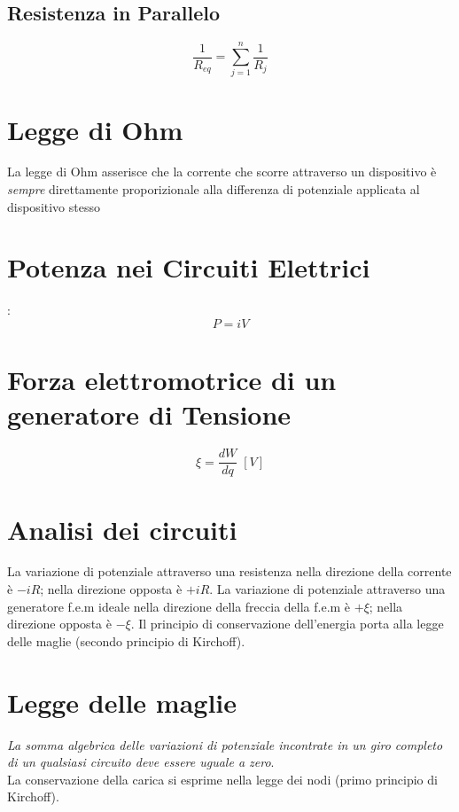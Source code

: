        \subsection*{Resistenza in Parallelo}
            \begin{equation*}
                \frac{1}{R_{eq}} = \sum_{j = 1}^{n} \frac{1}{R_j}
            \end{equation*}


    \section*{Legge di Ohm} La legge di Ohm asserisce che la corrente che scorre
    attraverso un dispositivo è \textit{sempre} direttamente proporizionale 
    alla differenza di potenziale applicata al dispositivo stesso

    \section*{Potenza nei Circuiti Elettrici}:
        \begin{equation*}
            P = iV
        \end{equation*}

    \section*{Forza elettromotrice di un generatore di Tensione}
        \begin{equation*}
            \xi = \frac{dW}{dq} \; [V]   
        \end{equation*}

    \section*{Analisi dei circuiti} La variazione di potenziale attraverso una 
    resistenza nella direzione della corrente è $-iR$; nella direzione opposta
    è $+iR$. La variazione di potenziale attraverso una generatore f.e.m ideale
    nella direzione della freccia della f.e.m è $+\xi$; nella direzione opposta
    è $-\xi$. Il principio di conservazione dell'energia porta alla legge delle
    maglie (secondo principio di Kirchoff).

    \section*{Legge delle maglie} \textit{La somma algebrica delle variazioni di
    potenziale incontrate in un giro completo di un qualsiasi circuito deve 
    essere uguale a zero}.\\
    La conservazione della carica si esprime nella legge dei nodi (primo 
    principio di Kirchoff).

